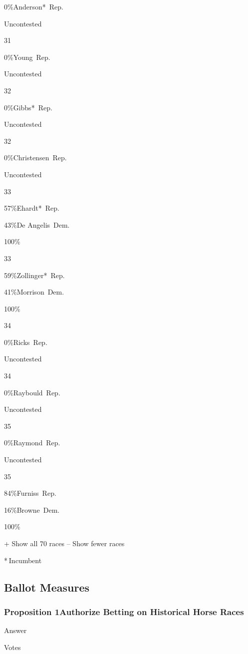  0\%Anderson*~Rep.

Uncontested

31

 0\%Young~Rep.

Uncontested

32

 0\%Gibbs*~Rep.

Uncontested

32

 0\%Christensen~Rep.

Uncontested

33

 57\%Ehardt*~Rep.

 43\%De Angelis~Dem.

100\%

33

 59\%Zollinger*~Rep.

 41\%Morrison~Dem.

100\%

34

 0\%Ricks~Rep.

Uncontested

34

 0\%Raybould~Rep.

Uncontested

35

 0\%Raymond~Rep.

Uncontested

35

 84\%Furniss~Rep.

 16\%Browne~Dem.

100\%

+ Show all 70 races -- Show fewer races

* Incumbent~

\hypertarget{ballot-measures}{%
\subsection{Ballot Measures}\label{ballot-measures}}

\hypertarget{proposition-1authorize-betting-on-historical-horse-races}{%
\subsubsection{Proposition 1Authorize Betting on Historical Horse
Races}\label{proposition-1authorize-betting-on-historical-horse-races}}

Answer

Votes

